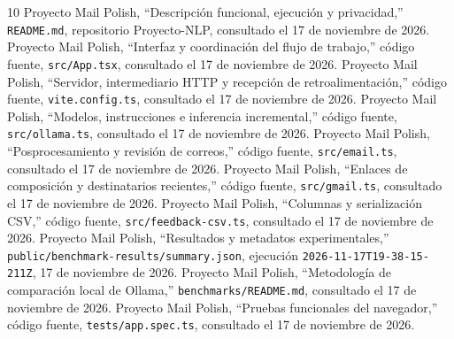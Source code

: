 \documentclass[conference]{IEEEtran}
\begin{document}
\begin{thebibliography}{10}
 Proyecto Mail Polish, ``Descripción funcional, ejecución y privacidad,'' \texttt{README.md}, repositorio Proyecto-NLP, consultado el 17 de noviembre de 2026.
 Proyecto Mail Polish, ``Interfaz y coordinación del flujo de trabajo,'' código fuente, \texttt{src/App.tsx}, consultado el 17 de noviembre de 2026.
 Proyecto Mail Polish, ``Servidor, intermediario HTTP y recepción de retroalimentación,'' código fuente, \texttt{vite.config.ts}, consultado el 17 de noviembre de 2026.
 Proyecto Mail Polish, ``Modelos, instrucciones e inferencia incremental,'' código fuente, \texttt{src/ollama.ts}, consultado el 17 de noviembre de 2026.
 Proyecto Mail Polish, ``Posprocesamiento y revisión de correos,'' código fuente, \texttt{src/email.ts}, consultado el 17 de noviembre de 2026.
 Proyecto Mail Polish, ``Enlaces de composición y destinatarios recientes,'' código fuente, \texttt{src/gmail.ts}, consultado el 17 de noviembre de 2026.
 Proyecto Mail Polish, ``Columnas y serialización CSV,'' código fuente, \texttt{src/feedback-csv.ts}, consultado el 17 de noviembre de 2026.
 Proyecto Mail Polish, ``Resultados y metadatos experimentales,'' \texttt{public/benchmark-results/summary.json}, ejecución \texttt{2026-11-17T19-38-15-211Z}, 17 de noviembre de 2026.
 Proyecto Mail Polish, ``Metodología de comparación local de Ollama,'' \texttt{benchmarks/README.md}, consultado el 17 de noviembre de 2026.
 Proyecto Mail Polish, ``Pruebas funcionales del navegador,'' código fuente, \texttt{tests/app.spec.ts}, consultado el 17 de noviembre de 2026.
\end{thebibliography}
\end{document}
